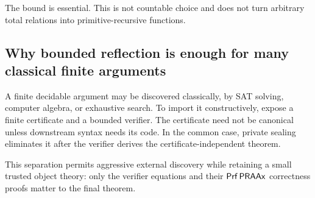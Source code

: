 The bound is essential.  This is not countable choice and does not turn arbitrary total relations into primitive-recursive functions.

\subsection{Why bounded reflection is enough for many classical finite arguments}

A finite decidable argument may be discovered classically, by SAT solving, computer algebra, or exhaustive search.  To import it constructively, expose a finite certificate and a bounded verifier.  The certificate need not be canonical unless downstream syntax needs its code.  In the common case, private sealing eliminates it after the verifier derives the certificate-independent theorem.

This separation permits aggressive external discovery while retaining a small trusted object theory: only the verifier equations and their \(\mathsf{Prf}\,\mathsf{PRAAx}\) correctness proofs matter to the final theorem.
